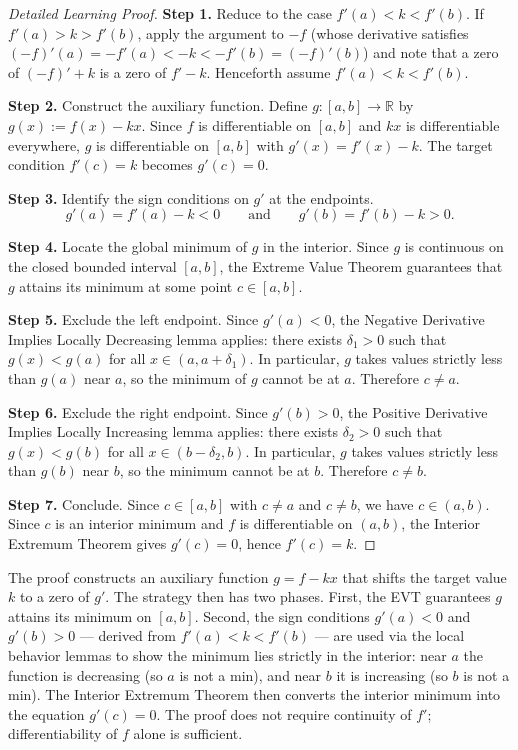 \begin{proof}[Detailed Learning Proof]
\LRAProofBodyStart

\textbf{Step 1.} Reduce to the case $f'(a) < k < f'(b)$. If $f'(a) > k > f'(b)$, apply the argument to $-f$ (whose derivative satisfies $(-f)'(a) = -f'(a) < -k < -f'(b) = (-f)'(b)$) and note that a zero of $(-f)' + k$ is a zero of $f' - k$. Henceforth assume $f'(a) < k < f'(b)$.

\textbf{Step 2.} Construct the auxiliary function. Define $g : [a,b] \to \mathbb{R}$ by $g(x) := f(x) - kx$. Since $f$ is differentiable on $[a,b]$ and $kx$ is differentiable everywhere, $g$ is differentiable on $[a,b]$ with $g'(x) = f'(x) - k$. The target condition $f'(c) = k$ becomes $g'(c) = 0$.

\textbf{Step 3.} Identify the sign conditions on $g'$ at the endpoints.
\[
g'(a) = f'(a) - k < 0 \qquad \text{and} \qquad g'(b) = f'(b) - k > 0.
\]

\textbf{Step 4.} Locate the global minimum of $g$ in the interior. Since $g$ is continuous on the closed bounded interval $[a,b]$, the Extreme Value Theorem guarantees that $g$ attains its minimum at some point $c \in [a,b]$.

\textbf{Step 5.} Exclude the left endpoint. Since $g'(a) < 0$, the Negative Derivative Implies Locally Decreasing lemma applies: there exists $\delta_1 > 0$ such that $g(x) < g(a)$ for all $x \in (a, a+\delta_1)$. In particular, $g$ takes values strictly less than $g(a)$ near $a$, so the minimum of $g$ cannot be at $a$. Therefore $c \neq a$.

\textbf{Step 6.} Exclude the right endpoint. Since $g'(b) > 0$, the Positive Derivative Implies Locally Increasing lemma applies: there exists $\delta_2 > 0$ such that $g(x) < g(b)$ for all $x \in (b-\delta_2, b)$. In particular, $g$ takes values strictly less than $g(b)$ near $b$, so the minimum cannot be at $b$. Therefore $c \neq b$.

\textbf{Step 7.} Conclude. Since $c \in [a,b]$ with $c \neq a$ and $c \neq b$, we have $c \in (a,b)$. Since $c$ is an interior minimum and $f$ is differentiable on $(a,b)$, the Interior Extremum Theorem gives $g'(c) = 0$, hence $f'(c) = k$.
\end{proof}

\begin{remark*}
The proof constructs an auxiliary function $g = f - kx$ that shifts the target value $k$ to a zero of $g'$. The strategy then has two phases. First, the EVT guarantees $g$ attains its minimum on $[a,b]$. Second, the sign conditions $g'(a) < 0$ and $g'(b) > 0$ --- derived from $f'(a) < k < f'(b)$ --- are used via the local behavior lemmas to show the minimum lies strictly in the interior: near $a$ the function is decreasing (so $a$ is not a min), and near $b$ it is increasing (so $b$ is not a min). The Interior Extremum Theorem then converts the interior minimum into the equation $g'(c) = 0$. The proof does not require continuity of $f'$; differentiability of $f$ alone is sufficient.
\end{remark*}

